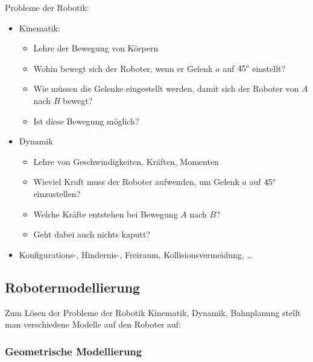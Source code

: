 Probleme der Robotik:
\begin{itemize}
\item Kinematik:
\begin{itemize}
\item Lehre der Bewegung von Körpern
\item Wohin bewegt sich der Roboter, wenn er Gelenk $a$ auf $45\degree$ einstellt?
\item Wie müssen die Gelenke eingestellt werden, damit sich der Roboter von $A$ nach $B$ bewegt?
\item Ist diese Bewegung möglich?
\end{itemize}
\item Dynamik
\begin{itemize}
\item Lehre von Geschwindigkeiten, Kräften, Momenten
\item Wieviel Kraft muss der Roboter aufwenden, um Gelenk $a$ auf $45\degree$ einzustellen?
\item Welche Kräfte entstehen bei Bewegung $A$ nach $B$?
\item Geht dabei auch nichts kaputt?
\end{itemize}
\item Konfigurations-, Hindernis-, Freiraum, Kollisionsvermeidung, \dots
\end{itemize}

\subsection{Robotermodellierung}

Zum Lösen der Probleme der Robotik Kinematik, Dynamik, Bahnplanung stellt man verschiedene Modelle auf den Roboter auf:


\subsubsection*{Geometrische Modellierung}

